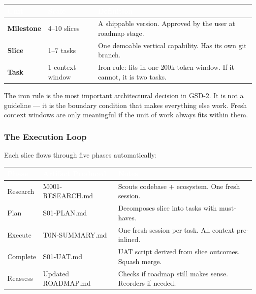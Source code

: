 \documentclass[11pt,letterpaper]{article}
\newcommand{\tableheader}[1]{\textbf{\sffamily\textcolor{white}{#1}}}
\begin{document}
\begin{center}
\begin{tabularx}{\textwidth}{L{2.5cm}L{2.5cm}X}
\toprule
{}
\tableheader{Unit} & \tableheader{Scale} & \tableheader{Definition} \\
\midrule
\textbf{Milestone} & 4--10 slices & A shippable version. Approved by the user at roadmap stage. \\
\textbf{Slice} & 1--7 tasks & One demoable vertical capability. Has its own git branch. \\
\textbf{Task} & 1 context window & Iron rule: fits in one 200k-token window. If it cannot, it is two tasks. \\
\bottomrule
\end{tabularx}
\end{center}

The iron rule is the most important architectural decision in GSD-2. It is not a guideline --- it is the boundary condition that makes everything else work. Fresh context windows are only meaningful if the unit of work always fits within them.

\subsubsection{The Execution Loop}

Each slice flows through five phases automatically:

\begin{center}
\begin{tabularx}{\textwidth}{L{2.5cm}L{2.5cm}X}
\toprule
{}
\tableheader{Phase} & \tableheader{Artifact Produced} & \tableheader{Notes} \\
\midrule
Research & M001-RESEARCH.md & Scouts codebase + ecosystem. One fresh session. \\
Plan & S01-PLAN.md & Decomposes slice into tasks with must-haves. \\
Execute & T0N-SUMMARY.md & One fresh session per task. All context pre-inlined. \\
Complete & S01-UAT.md & UAT script derived from slice outcomes. Squash merge. \\
Reassess & Updated ROADMAP.md & Checks if roadmap still makes sense. Reorders if needed. \\
\bottomrule
\end{tabularx}
\end{center}
\end{document}
